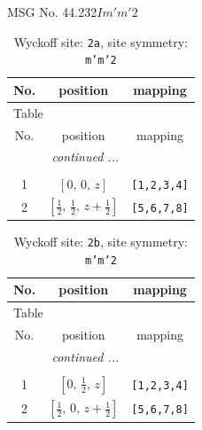 \documentclass[fleqn,8pt]{jsarticle}
\begin{document}
\setcounter{MaxMatrixCols}{32}

\renewcommand{\tablename}{Table~}
\renewcommand{\figurename}{Figure~}
\begin{center}
\LARGE
MSG No. 44.232\quad$Im'm'2$
\end{center}
\renewcommand{\arraystretch}{1.2}
\begin{longtable}{ccc}
\caption{Wyckoff site: {\tt 2a}, site symmetry: {\tt m'm'2}}
 \\
 \hline \hline
No. & position & mapping \\ \hline \endfirsthead

\multicolumn{2}{l}{\tablename\ \thetable{}} \\
 \hline \hline
No. & position & mapping \\ \hline \endhead

 \hline \hline
\multicolumn{2}{r}{\footnotesize\it continued ...} \\ \endfoot

 \hline \hline
\multicolumn{2}{r}{} \\ \endlastfoot

1 & $\left[ 0,\, 0,\, z \right]$ & {\tt [1,2,3,4]} \\ \hline
2 & $\left[ \frac{1}{2},\, \frac{1}{2},\, z + \frac{1}{2} \right]$ & {\tt [5,6,7,8]} \\
\end{longtable}
\renewcommand{\arraystretch}{1.2}
\begin{longtable}{ccc}
\caption{Wyckoff site: {\tt 2b}, site symmetry: {\tt m'm'2}}
 \\
 \hline \hline
No. & position & mapping \\ \hline \endfirsthead

\multicolumn{2}{l}{\tablename\ \thetable{}} \\
 \hline \hline
No. & position & mapping \\ \hline \endhead

 \hline \hline
\multicolumn{2}{r}{\footnotesize\it continued ...} \\ \endfoot

 \hline \hline
\multicolumn{2}{r}{} \\ \endlastfoot

1 & $\left[ 0,\, \frac{1}{2},\, z \right]$ & {\tt [1,2,3,4]} \\ \hline
2 & $\left[ \frac{1}{2},\, 0,\, z + \frac{1}{2} \right]$ & {\tt [5,6,7,8]} \\
\end{longtable}
\end{document}
